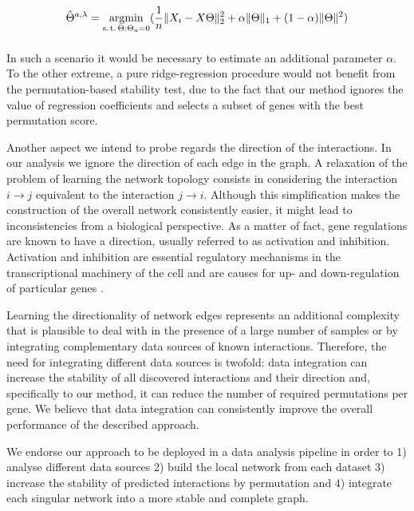 \begin{equation}
\label{eq:elnet}
    \hat{\Theta}^{a,\lambda} = 
    \argmin_{%
      \substack{%
        \text{s.\,t.}\, \Theta:\Theta_a = 0 \\
        \phantom{}\, 
      }
    }
    (\frac{1}{n} \| X_i - X\Theta \|^{2}_2 + \alpha \| \Theta \|_{1} + (1-\alpha) \| \Theta \|^{2})
  \end{equation}
   

In such a scenario it would be necessary to estimate an additional parameter $\alpha$. To the other extreme, a pure ridge-regression procedure would not benefit from the permutation-based stability test, due to the fact that our method ignores the value of regression coefficients and selects a subset of genes with the best permutation score.  

Another aspect we intend to probe regards the direction of the interactions. In our analysis we ignore the direction of each edge in the graph. A relaxation of the problem of learning the network topology consists in considering the interaction $i \rightarrow j$ equivalent to the interaction $j \rightarrow i$. Although this simplification makes the construction of the overall network consistently easier, it might lead to inconsistencies from a biological perspective. As a matter of fact, gene regulations are known to have a direction, usually referred to as activation and inhibition. Activation and inhibition are essential regulatory mechanisms in the transcriptional machinery of the cell and are causes for up- and down-regulation of particular genes \citealp{GeistlingerCKMZ11}.

 Learning the directionality of network edges represents an additional complexity that is plausible to deal with in the presence of a large number of samples or by integrating complementary data sources of known interactions. 
Therefore, the need for integrating different data sources is twofold: data integration can increase the stability of all discovered interactions and their direction and, specifically to our method, it can reduce the number of required permutations per gene. We believe that data integration can consistently  improve the overall performance of the described approach. 

We endorse our approach to be deployed in a data analysis pipeline in order to 1) analyse different data sources 2) build the local network from each dataset 3) increase the stability of predicted interactions by permutation and 4) integrate each singular network into a more stable and complete graph.


